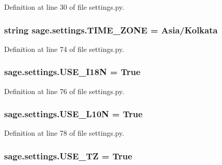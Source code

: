 Definition at line 30 of file settings.\+py.

\hypertarget{a00043_a07421ef620becc4c93753901abdf83c0}{}
\subsubsection[{T\+I\+M\+E\+\_\+\+Z\+O\+N\+E}]{\setlength{\rightskip}{0pt plus 5cm}string sage.\+settings.\+T\+I\+M\+E\+\_\+\+Z\+O\+N\+E = \textquotesingle{}Asia/Kolkata\textquotesingle{}}\label{a00043_a07421ef620becc4c93753901abdf83c0}


Definition at line 74 of file settings.\+py.

\hypertarget{a00043_acf5dd02a352695a98f57bef7679a29af}{}
\subsubsection[{U\+S\+E\+\_\+\+I18\+N}]{\setlength{\rightskip}{0pt plus 5cm}sage.\+settings.\+U\+S\+E\+\_\+\+I18\+N = True}\label{a00043_acf5dd02a352695a98f57bef7679a29af}


Definition at line 76 of file settings.\+py.

\hypertarget{a00043_a9d0e7298d4688c99e0ee9e965d950de0}{}
\subsubsection[{U\+S\+E\+\_\+\+L10\+N}]{\setlength{\rightskip}{0pt plus 5cm}sage.\+settings.\+U\+S\+E\+\_\+\+L10\+N = True}\label{a00043_a9d0e7298d4688c99e0ee9e965d950de0}


Definition at line 78 of file settings.\+py.

\hypertarget{a00043_aa385f778cd7bd79cc4c688fec7c101a2}{}
\subsubsection[{U\+S\+E\+\_\+\+T\+Z}]{\setlength{\rightskip}{0pt plus 5cm}sage.\+settings.\+U\+S\+E\+\_\+\+T\+Z = True}\label{a00043_aa385f778cd7bd79cc4c688fec7c101a2}


